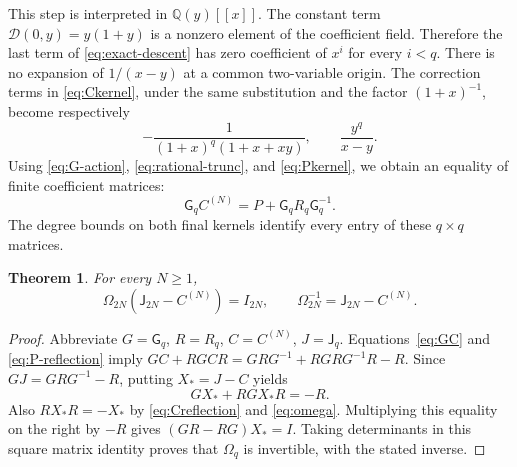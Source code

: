 \documentclass[11pt,a4paper]{amsart}
\newtheorem{theorem}{Theorem}[section]
\theoremstyle{remark}\newtheorem{remark}[theorem]{Remark}
\numberwithin{equation}{section}
\newcommand{\Q}{\mathbb Q}
\newcommand{\G}{\mathsf G}
\newcommand{\J}{\mathsf J}
\begin{document}
This step is interpreted in $\Q(y)[[x]]$. The constant term $\mathscr D(0,y)=y(1+y)$ is a nonzero element of the coefficient field. Therefore the last term of \eqref{eq:exact-descent} has zero coefficient of $x^i$ for every $i<q$. There is no expansion of $1/(x-y)$ at a common two-variable origin. The correction terms in \eqref{eq:Ckernel}, under the same substitution and the factor $(1+x)^{-1}$, become respectively
\[
 -\frac1{(1+x)^q(1+x+xy)},\qquad \frac{y^q}{x-y}.
\]
Using \eqref{eq:G-action}, \eqref{eq:rational-trunc}, and \eqref{eq:Pkernel}, we obtain an equality of finite coefficient matrices:
\begin{equation}\label{eq:GC}
 \G_qC^{(N)}=P+\G_qR_q\G_q^{-1}.
\end{equation}
The degree bounds on both final kernels identify every entry of these $q\times q$ matrices.

\begin{theorem}\label{thm:inverse}
For every $N\ge1$,
\begin{equation}\label{eq:inverse}
 \Omega_{2N}(\J_{2N}-C^{(N)})=I_{2N},\qquad
 \Omega_{2N}^{-1}=\J_{2N}-C^{(N)}.
\end{equation}
\end{theorem}
\begin{proof}
Abbreviate $G=\G_q$, $R=R_q$, $C=C^{(N)}$, $J=\J_q$. Equations~\eqref{eq:GC} and \eqref{eq:P-reflection} imply
$GC+RGCR=GRG^{-1}+RGRG^{-1}R-R$. Since $GJ=GRG^{-1}-R$, putting $X_*=J-C$ yields
\[
 GX_*+RGX_*R=-R.
\]
Also $RX_*R=-X_*$ by \eqref{eq:Creflection} and \eqref{eq:omega}. Multiplying this equality on the right by $-R$ gives
$(GR-RG)X_*=I$. Taking determinants in this square matrix identity proves that $\Omega_q$ is invertible, with the stated inverse.
\end{proof}
\end{document}
